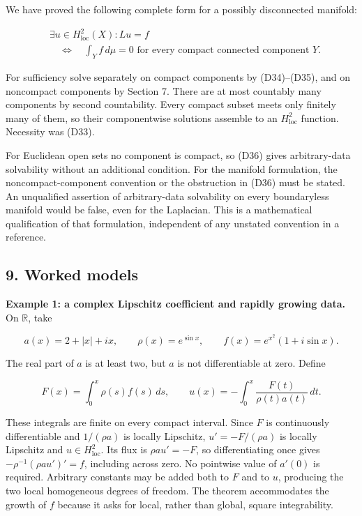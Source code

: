 \documentclass[
  11pt,
]{article}
\begin{document}
We have proved the following complete form for a possibly disconnected
manifold:

\[
 \begin{split}
 &\exists u\in H^2_{\mathrm{loc}}(X):Lu=f\\
 &\hspace{1em}\Longleftrightarrow\quad
 \int_Y f\,d\mu=0\text{ for every compact connected component }Y.
 \end{split}                                                     \tag{D36}
\]

For sufficiency solve separately on compact components by (D34)--(D35),
and on noncompact components by Section 7. There are at most countably
many components by second countability. Every compact subset meets only
finitely many of them, so their componentwise solutions assemble to an
\(H^2_{\mathrm{loc}}\) function. Necessity was (D33).

For Euclidean open sets no component is compact, so (D36) gives
arbitrary-data solvability without an additional condition. For the
manifold formulation, the noncompact-component convention or the
obstruction in (D36) must be stated. An unqualified assertion of
arbitrary-data solvability on every boundaryless manifold would be
false, even for the Laplacian. This is a mathematical qualification of
that formulation, independent of any unstated convention in a reference.

\subsection{9. Worked models}\label{worked-models}

\textbf{Example 1: a complex Lipschitz coefficient and rapidly growing
data.} On \(\mathbb R\), take

\[
 a(x)=2+|x|+ix,\qquad \rho(x)=e^{\sin x},\qquad
 f(x)=e^{x^2}(1+i\sin x).                                       \tag{D37}
\]

The real part of \(a\) is at least two, but \(a\) is not differentiable
at zero. Define

\[
 F(x)=\int_0^x\rho(s)f(s)\,ds,\qquad
 u(x)=-\int_0^x\frac{F(t)}{\rho(t)a(t)}\,dt.                     \tag{D38}
\]

These integrals are finite on every compact interval. Since \(F\) is
continuously differentiable and \(1/(\rho a)\) is locally Lipschitz,
\(u'=-F/(\rho a)\) is locally Lipschitz and \(u\in H^2_{\mathrm{loc}}\).
Its flux is \(\rho a u'=-F\), so differentiating once gives
\(-\rho^{-1}(\rho a u')'=f\), including across zero. No pointwise value
of \(a'(0)\) is required. Arbitrary constants may be added both to \(F\)
and to \(u\), producing the two local homogeneous degrees of freedom.
The theorem accommodates the growth of \(f\) because it asks for local,
rather than global, square integrability.
\end{document}
